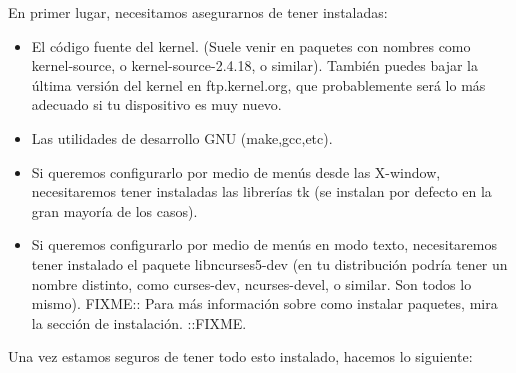 En primer lugar, necesitamos asegurarnos de tener instaladas:

\begin{itemize}

\item El código  fuente del kernel. (Suele venir en  paquetes con nombres 
como  kernel-source,  o  kernel-source-2.4.18,  o  similar).  También 
puedes  bajar la  última versión  del kernel  en ftp.kernel.org,  que 
probablemente será lo más adecuado si tu dispositivo es muy nuevo.    

\item Las utilidades de desarrollo GNU (make,gcc,etc).

\item Si  queremos configurarlo  por medio de  menús desde  las X-window, 
necesitaremos  tener instaladas  las  librerías tk  (se instalan  por 
defecto en la gran mayoría de los casos).                             

\item  Si queremos  configurarlo por  medio de  menús en  modo texto, 
necesitaremos  tener  instalado  el paquete  libncurses5-dev  (en  tu 
distribución  podría  tener  un  nombre  distinto,  como  curses-dev, 
ncurses-devel, o  similar. Son  todos lo mismo).  \Large{FIXME:: Para 
más  información sobre  como instalar  paquetes, mira  la sección  de 
instalación. ::FIXME}.                                                

\end{itemize}

Una vez estamos seguros de tener todo esto instalado, hacemos lo siguiente:

